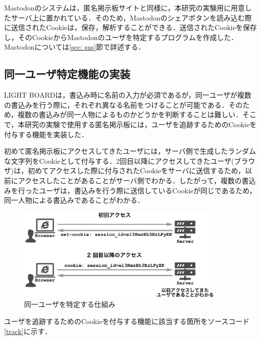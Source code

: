\documentclass[10pt, a4paper]{jreport}
\begin{document}
Mastodonのシステムは，匿名掲示板サイトと同様に，本研究の実験用に用意したサーバ上に置かれている．そのため，Mastodonのシェアボタンを読み込む際に送信されたCookieは，保存，解析することができる．送信されたCookieを保存し，そのCookieからMastodonのユーザを特定するプログラムを作成した．Mastodonについては\ref{sec: sns}節で詳述する．

\subsection{同一ユーザ特定機能の実装}
LIGHT BOARDは，書込み時に名前の入力が必須であるが，同一ユーザが複数の書込みを行う際に，それぞれ異なる名前をつけることが可能である．そのため，複数の書込みが同一人物によるものかどうかを判断することは難しい．そこで，本研究の実験で使用する匿名掲示板には，ユーザを追跡するためのCookieを付与する機能を実装した．

初めて匿名掲示板にアクセスしてきたユーザには，サーバ側で生成したランダムな文字列をCookieとして付与する．2回目以降にアクセスしてきたユーザ(ブラウザ)は，初めてアクセスした際に付与されたCookieをサーバに送信するため，以前にアクセスしたことがあることがサーバ側でわかる．したがって，複数の書込みを行ったユーザは，書込みを行う際に送信しているCookieが同じであるため，同一人物による書込みであることがわかる．

\begin{figure}[H]
	\begin{center}
		\includegraphics[width=100mm]{figures/user_tracking_cookie.pdf}
	\end{center}
	\caption{同一ユーザを特定する仕組み}
	\label{fig: user_tracking_cookie}
\end{figure}

ユーザを追跡するためのCookieを付与する機能に該当する箇所をソースコード\ref{track}に示す．
\end{document}
